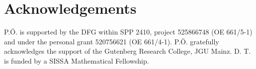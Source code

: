 \documentclass[USenglish]{article}
\newcommand{\1}{\begin{pmatrix}
		1\\
		1
\end{pmatrix}}
\newcommand{\PO}[1]{{\color{blue}#1}}
\begin{document}
	
	
	\section*{Acknowledgements}
	\PO{P.Ö. is supported by the DFG within SPP 2410, project  525866748 (OE 661/5-1) and under the personal grant 520756621 (OE 661/4-1).  P.Ö. gratefully acknowledges the 		 	support of the Gutenberg Research College, JGU Mainz.}
	D. T. is funded by a SISSA Mathematical Fellowship.
	
	
\end{document}
